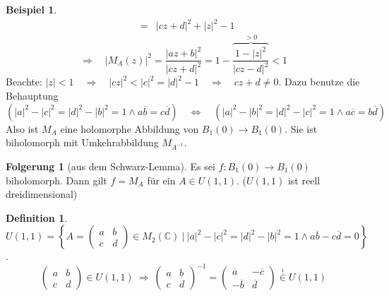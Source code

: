 \documentclass[11pt,titlepage]{article}
\theoremstyle{definition}
\newtheorem{corollary}[theorem]{Folgerung}
\newtheorem{definition}[theorem]{Definition}
\newtheorem{example}[theorem]{Beispiel}
\theoremstyle{remark}
\begin{document}
\begin{example}
\begin{eqnarray*}
			&=& |cz+d|^2 +|z|^2 -1
		\end{eqnarray*}
		\[\Rightarrow \quad |M_A(z)|^2 = \frac{|az+b|^2}{|cz+d|^2}=1-\overbrace{\frac{1-|z|^2}{|cz-d|^2}}^{
		>0}<1 \]
		Beachte: $|z|<1\quad\Rightarrow\quad |cz|^2 <|c|^2 =|d|^2 -1
		\quad\Rightarrow\quad cz+d\neq 0$. Dazu benutze die Behauptung
		\[ \left(|a|^2 -|c|^2 =|d|^2 -|b|^2 =1 \land a\overline{b} =c\overline{d}\right) 
		\quad\Leftrightarrow\quad 
		\left(|a|^2 -|b|^2 =|d|^2 -|c|^2 =1 \land a\overline{c}=b\overline{d}\right) \]
		Also ist $M_A$ eine holomorphe Abbildung von $B_1(0)\to B_1(0)$. Sie ist biholomorph mit 
		Umkehrabbildung $M_{A^{-1}}$.
	\end{example}
	
	\begin{corollary}[aus dem Schwarz-Lemma]
		Es sei $f: B_1(0)\to B_1(0)$ biholomorph. Dann gilt $f=M_A$ für ein $A\in U(1,1)$. 
		($U(1,1)$ ist reell dreidimensional)
	\end{corollary}
	
	\begin{definition}
		$U(1,1)=\left\{ A=\left(\begin{smallmatrix} a&b\\c&d \end{smallmatrix}
		\right)\in M_2 (\mathbb{C})\  \vert\  |a|^2 -|c|^2 =|d|^2 -|b|^2 =1 \land a\overline{b}-c\overline{d}=0 
		\right\}$.
		\[ \begin{pmatrix}a&b\\c&d\end{pmatrix}\in U(1,1)\ \Rightarrow\ 
		\begin{pmatrix}a&b\\c&d\end{pmatrix}^{-1}=\begin{pmatrix}\overline{a}&-\overline{c} \\
		-\overline{b}&\overline{d}\end{pmatrix}\overset{!}{\in}U(1,1) \]
	\end{definition}
	
\end{document}
